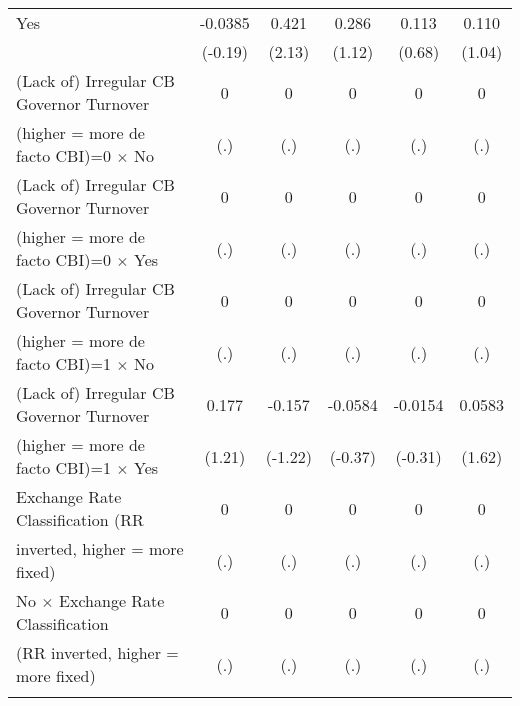 \begin{table}[htbp]
\begin{tabular}{l*{5}{c}}
Yes                                     &  -0.0385         &    0.421\sym{*}  &    0.286         &    0.113         &    0.110         \\
                                        &  (-0.19)         &   (2.13)         &   (1.12)         &   (0.68)         &   (1.04)         \\
\addlinespace
(Lack of) Irregular CB Governor Turnover&        0         &        0         &        0         &        0         &        0         \\
(higher = more de facto CBI)=0 $\times$ No&      (.)         &      (.)         &      (.)         &      (.)         &      (.)         \\
\addlinespace
(Lack of) Irregular CB Governor Turnover&        0         &        0         &        0         &        0         &        0         \\
(higher = more de facto CBI)=0 $\times$ Yes&      (.)         &      (.)         &      (.)         &      (.)         &      (.)         \\
\addlinespace
(Lack of) Irregular CB Governor Turnover&        0         &        0         &        0         &        0         &        0         \\
(higher = more de facto CBI)=1 $\times$ No&      (.)         &      (.)         &      (.)         &      (.)         &      (.)         \\
\addlinespace
(Lack of) Irregular CB Governor Turnover&    0.177         &   -0.157         &  -0.0584         &  -0.0154         &   0.0583         \\
(higher = more de facto CBI)=1 $\times$ Yes&   (1.21)         &  (-1.22)         &  (-0.37)         &  (-0.31)         &   (1.62)         \\
\addlinespace
Exchange Rate Classification (RR        &        0         &        0         &        0         &        0         &        0         \\
inverted, higher = more fixed)          &      (.)         &      (.)         &      (.)         &      (.)         &      (.)         \\
\addlinespace
No $\times$ Exchange Rate Classification&        0         &        0         &        0         &        0         &        0         \\
(RR inverted, higher = more fixed)      &      (.)         &      (.)         &      (.)         &      (.)         &      (.)         \\
\addlinespace

\end{tabular}
\end{table}
